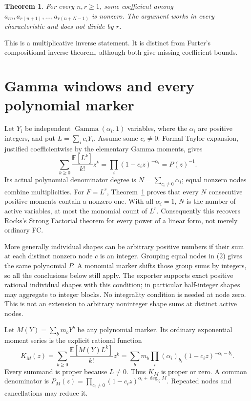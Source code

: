 \documentclass[11pt]{article}
\newtheorem{theorem}{Theorem}
\begin{document}
\begin{theorem}\label{thm:sections}
For every $n,r\ge1$, some coefficient among
$a_{rn},a_{r(n+1)},\ldots,a_{r(n+N-1)}$ is nonzero.
The argument works in every characteristic and does not divide by $r$.
\end{theorem}

This is a multiplicative inverse statement. It is distinct from Furter's
compositional inverse theorem, although both give missing-coefficient bounds.

\section{Gamma windows and every polynomial marker}
Let $Y_i$ be independent $\operatorname{Gamma}(\alpha_i,1)$ variables,
where the $\alpha_i$ are positive integers, and put $L=\sum_i c_iY_i$.
Assume some $c_i\ne0$. Formal Taylor expansion, justified coefficientwise
by the elementary Gamma moments, gives
\[
 \sum_{k\ge0}\frac{\mathbb E[L^k]}{k!}z^k
 =\prod_i(1-c_i z)^{-\alpha_i}=P(z)^{-1}.             \tag{2}
\]
Its actual polynomial denominator degree is
$N=\sum_{c_i\ne0}\alpha_i$; equal nonzero nodes combine multiplicities.
For $F=L^r$, Theorem~\ref{thm:sections} proves that every $N$ consecutive
positive moments contain a nonzero one. With all $\alpha_i=1$, $N$ is the
number of active variables, at most the monomial count of $L^r$.
Consequently this recovers Rocks's Strong Factorial theorem for every
power of a linear form, not merely ordinary FC.

More generally individual shapes can be arbitrary positive numbers if their
sum at each distinct nonzero node $c$ is an integer. Grouping equal nodes
in (2) gives the same polynomial $P$. A monomial marker shifts those group
sums by integers, so all the conclusions below still apply. The exporter
supports exact positive rational individual shapes with this condition;
in particular half-integer shapes may aggregate to integer blocks. No
integrality condition is needed at node zero. This is not an extension to
arbitrary noninteger shape sums at distinct active nodes.

Let $M(Y)=\sum_b m_bY^b$ be any polynomial marker. Its ordinary exponential
moment series is the explicit rational function
\[
 K_M(z)=\sum_{k\ge0}\frac{\mathbb E[M(Y)L^k]}{k!}z^k
 =\sum_b m_b\prod_i(\alpha_i)_{b_i}
                       (1-c_i z)^{-\alpha_i-b_i}.    \tag{3}
\]
Every summand is proper because $L\ne0$. Thus $K_M$ is proper or zero.
A common denominator is
$P_M(z)=\prod_{c_i\ne0}(1-c_i z)^{\alpha_i+\deg_{Y_i}M}$.
Repeated nodes and cancellations may reduce it.
\end{document}
